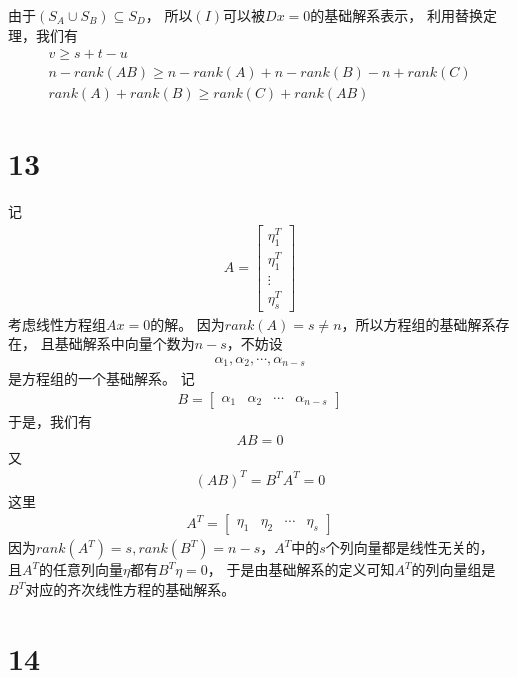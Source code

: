 \documentclass{article}
\begin{document}
由于$(S_A \cup S_B) \subseteq S_D$，
所以$(I)$可以被$Dx = 0$的基础解系表示，
利用替换定理，我们有
\begin{align*}
  v \geq s + t - u                                          \\
  n - rank(AB) \geq n - rank(A) + n - rank(B) - n + rank(C) \\
  rank(A) + rank(B) \geq rank(C) + rank(AB)
\end{align*}

\section*{13}

记
\begin{align*}
  A = \begin{bmatrix}
        \eta_1^T \\
        \eta_1^T \\
        \vdots   \\
        \eta_s^T
      \end{bmatrix}
\end{align*}
考虑线性方程组$Ax = 0$的解。
因为$rank(A) = s \neq n$，所以方程组的基础解系存在，
且基础解系中向量个数为$n - s$，不妨设
\begin{align*}
  \alpha_1, \alpha_2, \cdots, \alpha_{n - s}
\end{align*}
是方程组的一个基础解系。
记
\begin{align*}
  B = \begin{bmatrix}
        \alpha_1 & \alpha_2 & \cdots & \alpha_{n - s}
      \end{bmatrix}
\end{align*}
于是，我们有
\begin{align*}
  A B = 0
\end{align*}
又
\begin{align*}
  (AB)^T = B^T A^T = 0
\end{align*}
这里
\begin{align*}
  A^T = \begin{bmatrix}
          \eta_1 & \eta_2 & \cdots & \eta_s
        \end{bmatrix}
\end{align*}
因为$rank(A^T) = s, rank(B^T) = n - s$，$A^T$中的$s$个列向量都是线性无关的，
且$A^T$的任意列向量$\eta$都有$B^T \eta = 0$，
于是由基础解系的定义可知$A^T$的列向量组是$B^T$对应的齐次线性方程的基础解系。

\section*{14}
\end{document}
